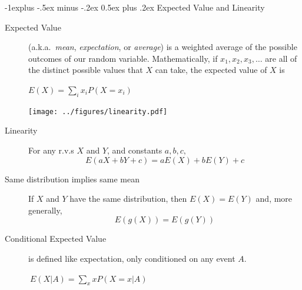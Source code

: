 \documentclass[10pt,landscape]{article}
\makeatletter
\renewcommand{\subsection}{\@startsection{subsection}{2}{0mm}%
{-1explus -.5ex minus -.2ex}%
{0.5ex plus .2ex}%
{\normalfont\normalsize\bfseries}}
\makeatother
\begin{document}
\begin{multicols*}{3}
        \subsection{Expected Value and Linearity}
        \begin{description}
            \item[Expected Value] (a.k.a.~\emph{mean}, \emph{expectation}, or \emph{average}) is a weighted average of the possible outcomes of our random variable. Mathematically, if $x_1, x_2, x_3, \dots$ are all of the distinct possible values that $X$ can take, the expected value of $X$ is
            \begin{center}
                $E(X) = \sum\limits_{i}x_iP(X=x_i)$
            \end{center}

            \begin{minipage}{\linewidth}
                \centering
                \texttt{[image: ../figures/linearity.pdf]}
            \end{minipage}

            \item[Linearity] For any r.v.s $X$ and $Y$, and constants $a,b,c,$
            \[E(aX + bY + c) = aE(X) + bE(Y) + c \]

            \item[Same distribution implies same mean] If $X$ and $Y$ have the same distribution, then $E(X)=E(Y)$ and, more generally,
            $$E(g(X)) = E(g(Y))$$

            \item[Conditional Expected Value] is defined like expectation, only conditioned on any event $A$. \begin{center}
                                                                                                                  $\ E(X | A) = \sum\limits_{x}xP(X=x | A)$
            \end{center}
        \end{description}


\end{multicols*}
\end{document}
